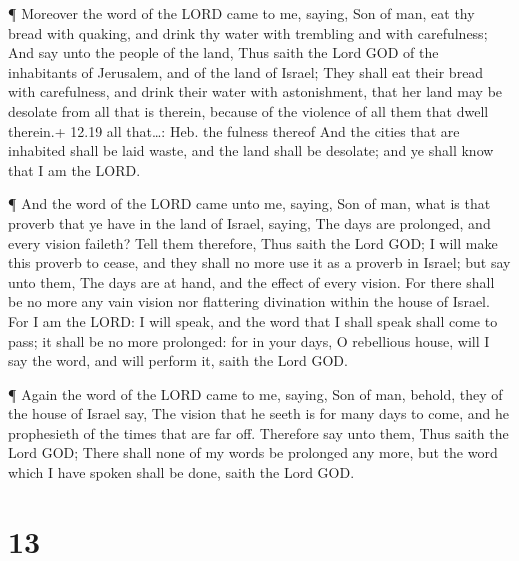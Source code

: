 ¶ Moreover the word of the LORD came to me, saying,
 Son of man, eat thy bread with quaking, and drink thy
water with trembling and with carefulness;  And say unto
the people of the land, Thus saith the Lord GOD of the inhabitants of
Jerusalem, and of the land of Israel; They shall eat their bread with
carefulness, and drink their water with astonishment, that her land may
be desolate from all that is therein, because of the violence of all
them that dwell therein.+ 12.19 all that\ldots: Heb. the fulness thereof
 And the cities that are inhabited shall be laid waste, and
the land shall be desolate; and ye shall know that I am the LORD.

 ¶ And the word of the LORD came unto me, saying,
 Son of man, what is that proverb that ye have in the land
of Israel, saying, The days are prolonged, and every vision faileth?
 Tell them therefore, Thus saith the Lord GOD; I will make
this proverb to cease, and they shall no more use it as a proverb in
Israel; but say unto them, The days are at hand, and the effect of every
vision.  For there shall be no more any vain vision nor
flattering divination within the house of Israel.  For I am
the LORD: I will speak, and the word that I shall speak shall come to
pass; it shall be no more prolonged: for in your days, O rebellious
house, will I say the word, and will perform it, saith the Lord GOD.

 ¶ Again the word of the LORD came to me, saying,
 Son of man, behold, they of the house of Israel say, The
vision that he seeth is for many days to come, and he prophesieth of the
times that are far off.  Therefore say unto them, Thus
saith the Lord GOD; There shall none of my words be prolonged any more,
but the word which I have spoken shall be done, saith the Lord GOD.

\hypertarget{section-12}{%
\section{13}\label{section-12}}

